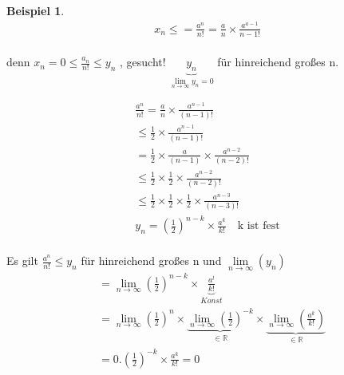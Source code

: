 \documentclass[a4paper,12pt,leqno]{report}
\theoremstyle{plain} %
\theoremstyle{definition} %
\newtheorem{example}[theorem]{Beispiel}
\begin{document}
\begin{example}
\begin{equation}
\begin{aligned}
x_n \leq  = \frac{a^n}{n!} = \frac{a}{n} \times \frac{a^{a-1}}{n-1!} %
\end{aligned}
\end{equation}\\

denn $ x_n = 0 \leq \frac{a_n}{n!} \leq y_n$
, gesucht! $\underbrace{y_n}_{\lim\limits_{n \rightarrow \infty}{y_n}=0}$  für hinreichend großes n.

\begin{equation}
\begin{aligned}
\frac{a^n}{n!} = \frac{a}{n} \times \frac{a^{n-1}}{(n-1)!} \\ \leq
\frac{1}{2} \times
\frac{a^{n-1}}{(n-1)!} \\ =
 \frac{1}{2} \times
\frac{a}{(n-1)} \times
\frac{a^{n-2}}{(n-2)!} \\ \leq
\frac{1}{2} \times
\frac{1}{2} \times
\frac{a^{n-2}}{(n-2)!} \\ \leq
\frac{1}{2} \times
\frac{1}{2} \times
\frac{1}{2} \times
\frac{a^{n-3}}{(n-3)!}\\
%
y_n = (\frac{1}{2})^{n-k} \times \frac{a^k}{k!} \quad \text{k ist fest}
 \end{aligned}
\end{equation}\\

{Es gilt} $\frac{a^n}{n!} \leq y_n$  für hinreichend großes n und
 $\lim\limits_{n \rightarrow \infty}{(y_n)}$ \\

\begin{equation}
\begin{aligned}
&=
\lim\limits_{n \rightarrow \infty}{(\frac{1}{2})^{n-k}} \times
\underbrace{\frac{a^l}{k!}}_{Konst} \\
&=
\lim\limits_{n \rightarrow \infty}{(\frac{1}{2})^{n}} \times
\underbrace{\lim\limits_{n \rightarrow \infty}{(\frac{1}{2})^{-k}}}_{\in \mathbb{R}} \times
\underbrace{\lim\limits_{n \rightarrow \infty}{(\frac{a^k}{k!})}}_{\in \mathbb{R}} \\
&= 0 . (\frac{1}{2})^{-k} \times \frac{a^k}{k!}=0
\\
\end{aligned}
\end{equation}
\end{example}
\end{document}
